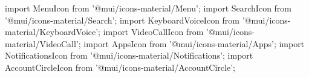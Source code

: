 import MenuIcon from '@mui/icons-material/Menu';
import SearchIcon from '@mui/icons-material/Search';
import KeyboardVoiceIcon from '@mui/icons-material/KeyboardVoice';
import VideoCallIcon from '@mui/icons-material/VideoCall';
import AppsIcon from '@mui/icons-material/Apps';
import NotificationsIcon from '@mui/icons-material/Notifications';
import AccountCircleIcon from '@mui/icons-material/AccountCircle';